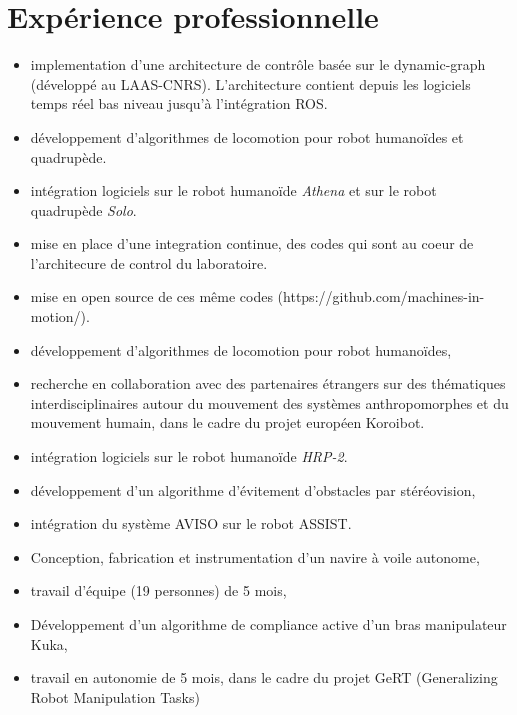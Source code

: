 \documentclass[11pt,a4paper,sans]{moderncv}        %
\newcommand{\items}{\item \hspace{2mm}}
\begin{document}
\section{Exp\'erience professionnelle}
{
  \begin{itemize}%
    \items implementation d'une architecture de contr\^ole bas\'ee sur le 
    dynamic-graph (d\'evelopp\'e au LAAS-CNRS). L'architecture contient
    depuis les logiciels temps r\'eel bas niveau jusqu'à l'int\'egration ROS.
    \items d\'eveloppement d'algorithmes de locomotion pour robot humano\"ides
    et quadrup\`ede.
    \items int\'egration logiciels sur le robot humano\"ide \emph{Athena} et
    sur le robot quadrup\`ede \emph{Solo}.
    \items mise en place d'une integration continue, des codes qui sont au coeur
    de l'architecure de control du laboratoire.
    \items mise en open source de ces m\^eme codes
    (https://github.com/machines-in-motion/).    
  \end{itemize}
}
{
  \begin{itemize}%
    \items d\'eveloppement d'algorithmes de locomotion pour robot humano\"ides,
    \items recherche en collaboration avec des partenaires \'etrangers sur des
    th\'ematiques interdisciplinaires autour du mouvement des syst\`emes
    anthropomorphes et du mouvement humain, dans le cadre du projet europ\'een
    Koroibot.
    \items int\'egration logiciels sur le robot humano\"ide \emph{HRP-2}.
  \end{itemize}
}
%
%
{
  \begin{itemize}%
    \items d\'eveloppement d'un algorithme d'\'evitement d'obstacles par st\'er\'eovision,
    \items int\'egration du syst\`eme AVISO sur le robot ASSIST.
  \end{itemize}
}
%
%
{
  \begin{itemize}%
    \items Conception, fabrication et instrumentation d'un navire \`a voile autonome,
    \items travail d'\'equipe (19 personnes) de 5 mois,
  \end{itemize}
}
%
%
%
{
  \begin{itemize}%
    \items D\'eveloppement d'un algorithme de compliance active d'un bras manipulateur Kuka,
    \items travail en autonomie de 5 mois, dans le cadre du projet GeRT (Generalizing Robot Manipulation Tasks)
  \end{itemize}
}
\end{document}
